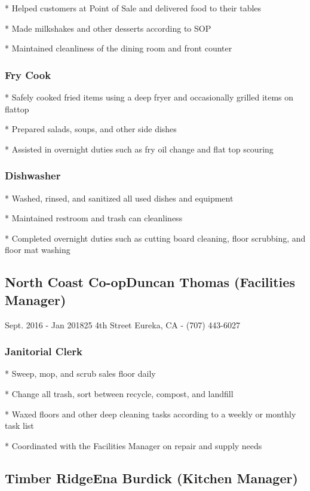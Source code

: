 \documentclass{article}
\begin{document}
* Helped customers at Point of Sale and delivered food to their tables

* Made milkshakes and other desserts according to SOP

* Maintained cleanliness of the dining room and front counter

\subsubsection{Fry Cook}

* Safely cooked fried items using a deep fryer and occasionally grilled items on flattop

* Prepared salads, soups, and other side dishes

* Assisted in overnight duties such as fry oil change and flat top scouring

\subsubsection{Dishwasher}

* Washed, rinsed, and sanitized all used dishes and equipment

* Maintained restroom and trash can cleanliness

* Completed overnight duties such as cutting board cleaning, floor scrubbing, and floor mat washing

\subsection{North Coast Co-op\hfill Duncan Thomas (Facilities Manager)}

\hspace{-.3in}Sept. 2016 - Jan 2018\hfill 25 4th Street Eureka, CA - (707) 443-6027

\subsubsection{Janitorial Clerk}

* Sweep, mop, and scrub sales floor daily

* Change all trash, sort between recycle, compost, and landfill

* Waxed floors and other deep cleaning tasks according to a weekly or monthly task list

* Coordinated with the Facilities Manager on repair and supply needs

\subsection{Timber Ridge\hfill Ena Burdick (Kitchen Manager)}
\end{document}
